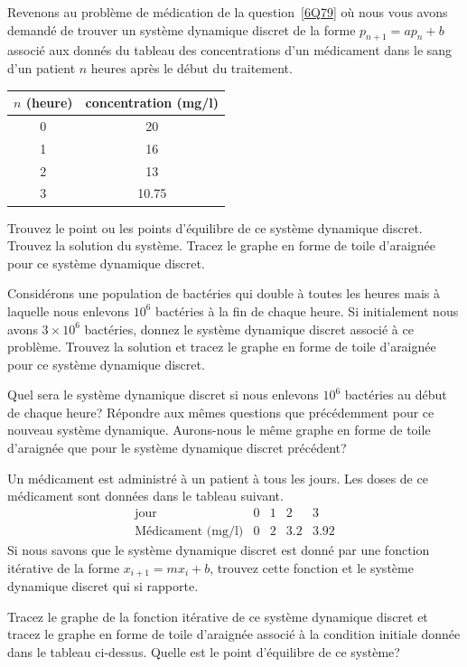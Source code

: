 \begin{question}[\life]
Revenons au problème de médication de la question~\ref{6Q79} où
nous vous avons demandé de trouver un système dynamique discret de la forme
$p_{n+1} = a p_n + b$ associé aux donnés du tableau des concentrations
d'un médicament dans le sang d'un patient $n$ heures après le début du
traitement.
\begin{center}
\begin{tabular}{c|c}
$n$ (heure) & concentration (mg/l) \\
\hline
0 & 20 \\
1 & 16 \\
2 & 13 \\
3 & 10.75
\end{tabular}
\end{center}
Trouvez le point ou les points d'équilibre de ce système dynamique
discret. Trouvez la solution du système.  Tracez le graphe en forme de
toile d'araignée pour ce système dynamique discret.
\label{6Q85}
\end{question}

\begin{question}[\life]
Considérons une population de bactéries qui double à toutes les
heures mais à laquelle nous enlevons $10^6$ bactéries à la fin de chaque
heure.  Si initialement nous avons $3\times 10^6$ bactéries, donnez le
système dynamique discret associé à ce problème.  Trouvez la solution
et tracez le graphe en forme de toile d'araignée pour ce
système dynamique discret.

Quel sera le système dynamique discret si nous enlevons $10^6$ bactéries
au début de chaque heure?  Répondre aux mêmes questions que
précédemment pour ce nouveau système dynamique.  Aurons-nous le même
graphe en forme de toile d'araignée que pour le système dynamique
discret précédent?
\label{6Q86}
\end{question}

\begin{question}[\life]
Un médicament est administré à un patient à tous les jours.  Les doses
de ce médicament sont données dans le tableau suivant.
\[
\begin{array}{l|c|c|c|c}
\text{jour} & 0 & 1 & 2 & 3 \\
\hline
\text{Médicament (mg/l)} & 0 & 2 & 3.2 & 3.92
\end{array}
\]
Si nous savons que le système dynamique discret est donné par une fonction
itérative de la forme $x_{i+1} = m x_i + b$, trouvez cette fonction et
le système dynamique discret qui si rapporte.

Tracez le graphe de la fonction itérative de ce système dynamique
discret et tracez le graphe en forme de toile d'araignée associé à
la condition initiale donnée dans le tableau ci-dessus.  Quelle est le
point d'équilibre de ce système?
\label{6Q87}
\end{question}

